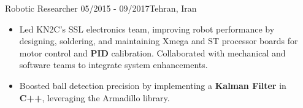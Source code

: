 \resumeSubheadingReza
{Robotic Researcher}{}
{05/2015 - 09/2017}{Tehran, Iran}
{
    \vspace{-12pt}
    \begin{itemize}
        \item{Led KN2C's SSL electronics team, improving robot performance by designing, soldering, and maintaining Xmega and ST processor boards for motor control and \textbf{PID} calibration. Collaborated with mechanical and software teams to integrate system enhancements.}
        
        \item{Boosted ball detection precision by implementing a \textbf{Kalman Filter} in \textbf{C++}, leveraging the Armadillo library.}
    \end{itemize}
}


